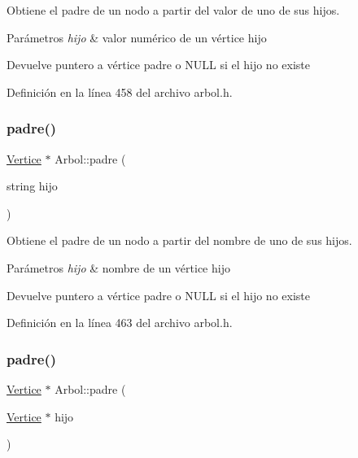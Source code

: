 Obtiene el padre de un nodo a partir del valor de uno de sus hijos. 


\begin{DoxyParams}{Parámetros}
{\em hijo} & valor numérico de un vértice hijo \\
\hline
\end{DoxyParams}
\begin{DoxyReturn}{Devuelve}
puntero a vértice padre o N\+U\+LL si el hijo no existe 
\end{DoxyReturn}


Definición en la línea 458 del archivo arbol.\+h.

\mbox{\label{classArbol_a53527e7a8999ceda0b8a0fa25a3f357c}} 
\subsubsection{\texorpdfstring{padre()}{padre()}\hspace{0.1cm}{\footnotesize\ttfamily [2/3]}}
{\footnotesize\ttfamily \hyperlink{classVertice}{Vertice} $\ast$ Arbol\+::padre (\begin{DoxyParamCaption}\item[{string}]{hijo }\end{DoxyParamCaption})}



Obtiene el padre de un nodo a partir del nombre de uno de sus hijos. 


\begin{DoxyParams}{Parámetros}
{\em hijo} & nombre de un vértice hijo \\
\hline
\end{DoxyParams}
\begin{DoxyReturn}{Devuelve}
puntero a vértice padre o N\+U\+LL si el hijo no existe 
\end{DoxyReturn}


Definición en la línea 463 del archivo arbol.\+h.

\mbox{\label{classArbol_a3395234bc7b7a91d2880e10367039284}} 
\subsubsection{\texorpdfstring{padre()}{padre()}\hspace{0.1cm}{\footnotesize\ttfamily [3/3]}}
{\footnotesize\ttfamily \hyperlink{classVertice}{Vertice} $\ast$ Arbol\+::padre (\begin{DoxyParamCaption}\item[{\hyperlink{classVertice}{Vertice} $\ast$}]{hijo }\end{DoxyParamCaption})}



